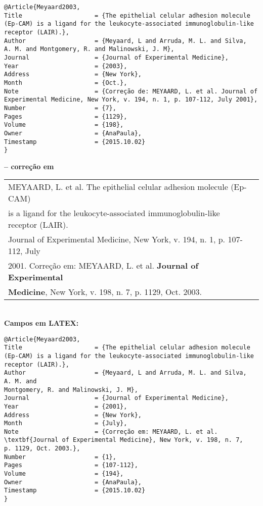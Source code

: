 \begin{verbatim}
@Article{Meyaard2003,
Title                    = {The epithelial celular adhesion molecule 
(Ep-CAM) is a ligand for the leukocyte-associated immunoglobulin-like 
receptor (LAIR).}, 
Author                   = {Meyaard, L and Arruda, M. L. and Silva, 
A. M. and Montgomery, R. and Malinowski, J. M},
Journal                  = {Journal of Experimental Medicine},
Year                     = {2003},
Address                  = {New York},
Month                    = {Oct.},
Note                     = {Correção de: MEYAARD, L. et al. Journal of 
Experimental Medicine, New York, v. 194, n. 1, p. 107-112, July 2001},
Number                   = {7},
Pages                    = {1129},
Volume                   = {198},
Owner                    = {AnaPaula},
Timestamp                = {2015.10.02}
}
\end{verbatim}

\textbf{-- correção em} \\

\begin{tabular}{|l|c|} \hline
MEYAARD, L. et al. The epithelial celular adhesion molecule (Ep-CAM)
\\is a ligand for the leukocyte-associated immunoglobulin-like receptor
(LAIR). \\Journal of Experimental Medicine, New York, v. 194, n. 1, p. 107-112, July \\2001. Correção em: MEYAARD, L. et al. \textbf{Journal of Experimental}\\ \textbf{Medicine}, New York, v. 198, n. 7, p. 1129, Oct. 2003. 
	\\\hline
\end{tabular} \\

\textbf{Campos em LATEX:} 

\begin{verbatim}
@Article{Meyaard2003,
Title                    = {The epithelial celular adhesion molecule 
(Ep-CAM) is a ligand for the leukocyte-associated immunoglobulin-like 
receptor (LAIR).},
Author                   = {Meyaard, L and Arruda, M. L. and Silva, 
A. M. and 
Montgomery, R. and Malinowski, J. M},
Journal                  = {Journal of Experimental Medicine},
Year                     = {2001},
Address                  = {New York},
Month                    = {July},
Note                     = {Correção em: MEYAARD, L. et al. 
\textbf{Journal of Experimental Medicine}, New York, v. 198, n. 7, 
p. 1129, Oct. 2003.},
Number                   = {1},
Pages                    = {107-112},
Volume                   = {194},
Owner                    = {AnaPaula},
Timestamp                = {2015.10.02}
}
\end{verbatim}

